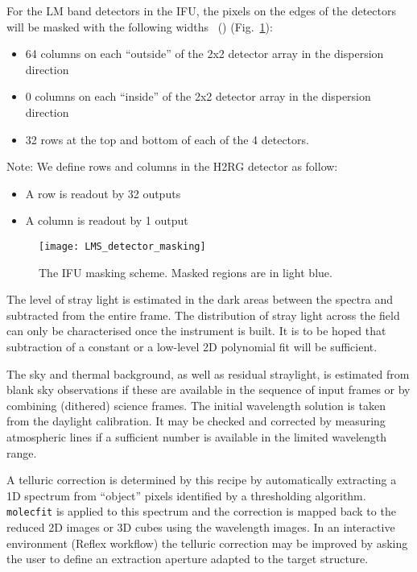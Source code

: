 For the LM band detectors in the IFU, the pixels on the edges of the detectors will be masked with the following widths~\cite{matisse_minutes} () (Fig.~\ref{fig:ifu_detector_masking}):
\begin{itemize}
\item 64 columns on each ``outside'' of the 2x2 detector array in the dispersion direction
\item 0 columns on each ``inside'' of the 2x2 detector array in the dispersion direction
\item 32 rows at the top and bottom of each of the 4 detectors.
\end{itemize}
Note: We define rows and columns in the H2RG detector as follow:
\begin{itemize}
\item A row is readout by 32 outputs
\item A column is readout by 1 output
\end{itemize}

\begin{figure}[hb]
  \centering
  \texttt{[image: LMS\_detector\_masking]}
  \caption[Recipe: ]{%
    The IFU masking scheme. Masked regions are in light blue.}
  \label{fig:ifu_detector_masking}
\end{figure}



The level of stray light is estimated in the dark areas between the
spectra and subtracted from the entire frame. The distribution of
stray light across the field can only be characterised once the
instrument is built. It is to be hoped that subtraction of a constant
or a low-level 2D polynomial fit will be sufficient.

The sky and thermal background, as well as residual straylight, is
estimated from blank sky observations if these are available in the
sequence of input frames or by combining (dithered) science
frames. The initial wavelength solution is taken from the daylight
calibration. It may be checked and corrected by measuring atmospheric
lines if a sufficient number is available in the limited wavelength
range.

A telluric correction is determined by this recipe by automatically
extracting a 1D spectrum from ``object'' pixels identified by a
thresholding algorithm. \lstinline{molecfit} is applied to this
spectrum and the correction is mapped back to the reduced 2D images or
3D cubes using the wavelength images. In an interactive environment
(Reflex workflow) the telluric correction may be improved by asking
the user to define an extraction aperture adapted to the target
structure.


